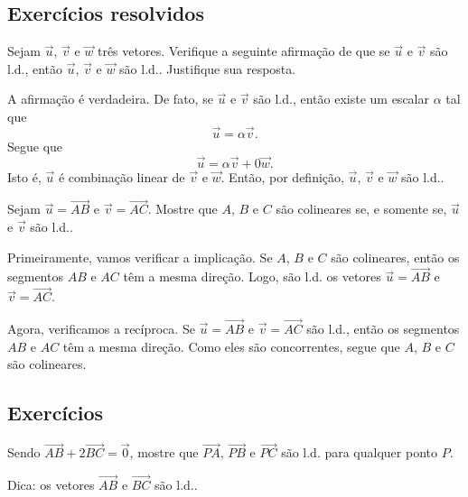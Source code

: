 \subsection*{Exercícios resolvidos}

\begin{exeresol}
  Sejam $\vec{u}$, $\vec{v}$ e $\vec{w}$ três vetores. Verifique a seguinte afirmação de que se $\vec{u}$ e $\vec{v}$ são l.d., então $\vec{u}$, $\vec{v}$ e $\vec{w}$ são l.d.. Justifique sua resposta.
\end{exeresol}
\begin{resol}
  A afirmação é verdadeira. De fato, se $\vec{u}$ e $\vec{v}$ são l.d., então existe um escalar $\alpha$ tal que
  \begin{equation}
    \vec{u} = \alpha\vec{v}.
  \end{equation}
  Segue que
  \begin{equation}
    \vec{u} = \alpha\vec{v} + 0\vec{w}.
  \end{equation}
  Isto é, $\vec{u}$ é combinação linear de $\vec{v}$ e $\vec{w}$. Então, por definição, $\vec{u}$, $\vec{v}$ e $\vec{w}$ são l.d..
\end{resol}

\begin{exeresol}
  Sejam $\vec{u} = \overrightarrow{AB}$ e $\vec{v} = \overrightarrow{AC}$. Mostre que $A$, $B$ e $C$ são colineares se, e somente se, $\vec{u}$ e $\vec{v}$ são l.d..
\end{exeresol}
\begin{resol}
  Primeiramente, vamos verificar a implicação. Se $A$, $B$ e $C$ são colineares, então os segmentos $AB$ e $AC$ têm a mesma direção. Logo, são l.d. os vetores $\vec{u} = \overrightarrow{AB}$ e $\vec{v} = \overrightarrow{AC}$.

  Agora, verificamos a recíproca. Se $\vec{u} = \overrightarrow{AB}$ e $\vec{v} = \overrightarrow{AC}$ são l.d., então os segmentos $AB$ e $AC$ têm a mesma direção. Como eles são concorrentes, segue que $A$, $B$ e $C$ são colineares.
\end{resol}

\subsection*{Exercícios}

\begin{exer}
  Sendo $\overrightarrow{AB} + 2\overrightarrow{BC} = \vec{0}$, mostre que $\overrightarrow{PA}$, $\overrightarrow{PB}$ e $\overrightarrow{PC}$ são l.d. para qualquer ponto $P$.
\end{exer}
\begin{resp}
  Dica: os vetores $\overrightarrow{AB}$ e $\overrightarrow{BC}$ são l.d..
\end{resp}

